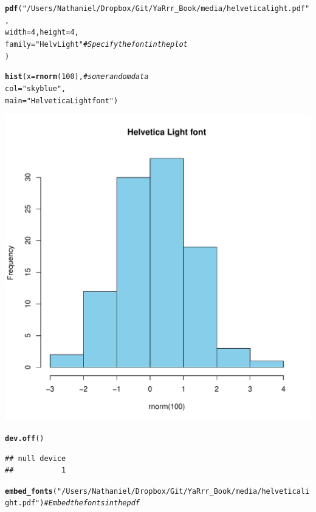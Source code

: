 \documentclass{tufte-book}\usepackage[]{graphicx}\usepackage[]{color}
\makeatletter
\def\maxwidth{ %
  \ifdim\Gin@nat@width>\linewidth
    \linewidth
  \else
    \Gin@nat@width
  \fi
}
\newcommand{\hlnum}[1]{\textcolor[rgb]{0.686,0.059,0.569}{#1}}%
\newcommand{\hlstr}[1]{\textcolor[rgb]{0.192,0.494,0.8}{#1}}%
\newcommand{\hlcom}[1]{\textcolor[rgb]{0.678,0.584,0.686}{\textit{#1}}}%
\newcommand{\hlstd}[1]{\textcolor[rgb]{0.345,0.345,0.345}{#1}}%
\newcommand{\hlkwc}[1]{\textcolor[rgb]{0.333,0.667,0.333}{#1}}%
\newcommand{\hlkwd}[1]{\textcolor[rgb]{0.737,0.353,0.396}{\textbf{#1}}}%
\newenvironment{kframe}{%
 \def\at@end@of@kframe{}%
 \ifinner\ifhmode%
  \def\at@end@of@kframe{\end{minipage}}%
  \begin{minipage}{\columnwidth}%
 \fi\fi%
 \def\FrameCommand##1{\hskip\@totalleftmargin \hskip-\fboxsep
 \colorbox{shadecolor}{##1}\hskip-\fboxsep
     \hskip-\linewidth \hskip-\@totalleftmargin \hskip\columnwidth}%
 \MakeFramed {\advance\hsize-\width
   \@totalleftmargin\z@ \linewidth\hsize
   \@setminipage}}%
 {\par\unskip\endMakeFramed%
 \at@end@of@kframe}
\newenvironment{knitrout}{}{} %
\makeatother
\begin{document}
\begin{knitrout}
\color{fgcolor}\begin{kframe}
\begin{alltt}
\hlkwd{pdf}\hlstd{(}\hlstr{"/Users/Nathaniel/Dropbox/Git/YaRrr_Book/media/helveticalight.pdf"}\hlstd{,}
    \hlkwc{width} \hlstd{=} \hlnum{4}\hlstd{,} \hlkwc{height} \hlstd{=} \hlnum{4}\hlstd{,}
    \hlkwc{family} \hlstd{=} \hlstr{"HelvLight"} \hlcom{# Specify the font in the plot}
    \hlstd{)}
\end{alltt}


{\ttfamily\noindent\bfseries{}}\begin{alltt}
\hlkwd{hist}\hlstd{(}\hlkwc{x} \hlstd{=} \hlkwd{rnorm}\hlstd{(}\hlnum{100}\hlstd{),} \hlcom{# some random data}
     \hlkwc{col} \hlstd{=} \hlstr{"skyblue"}\hlstd{,}
     \hlkwc{main} \hlstd{=} \hlstr{"Helvetica Light font"}\hlstd{)}
\end{alltt}
\end{kframe}
\includegraphics[width=\maxwidth]{figure/unnamed-chunk-246-1} 
\begin{kframe}\begin{alltt}
\hlkwd{dev.off}\hlstd{()}
\end{alltt}
\begin{verbatim}
## null device 
##           1
\end{verbatim}
\begin{alltt}
\hlkwd{embed_fonts}\hlstd{(}\hlstr{"/Users/Nathaniel/Dropbox/Git/YaRrr_Book/media/helveticalight.pdf"}\hlstd{)} \hlcom{# Embed the fonts in the pdf}
\end{alltt}
\end{kframe}
\end{knitrout}
\end{document}
